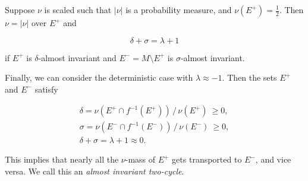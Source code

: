 \begin{theorem}
    \label{thm:almost}
    \cite*{attr}
    Suppose $\nu$ is scaled such that $| \nu |$ is a probability measure, and 
    $\nu (E^+) = \frac{1}{2}$. Then $\nu = | \nu |$ over $E^+$ and 

    \begin{equation}
        \delta + \sigma = \lambda + 1
    \end{equation}

    if $E^+$ is $\delta$-almost invariant and $E^- = M \setminus E^+$ is $\sigma$-almost 
    invariant.
\end{theorem}

\begin{example}
    \label{ex:almost}
    Finally, we can consider the deterministic case with $\lambda \approx -1$. Then the sets 
    $E^+$ and $E^-$ satisfy
    
    \begin{gather}
        \delta = \nu (E^+ \cap f^{-1} (E^+))\, /\, \nu (E^+)\ \geq 0, \\
        \sigma = \nu (E^- \cap f^{-1} (E^-))\, /\, \nu (E^-)\ \geq 0, \\
        \delta + \sigma = \lambda + 1 \approx 0.
    \end{gather}
    
    This implies that nearly all the $\nu$-mass of $E^+$ gets transported to $E^-$, and vice 
    versa. We call this an \emph{almost invariant two-cycle}.     
\end{example} 

\newpage

